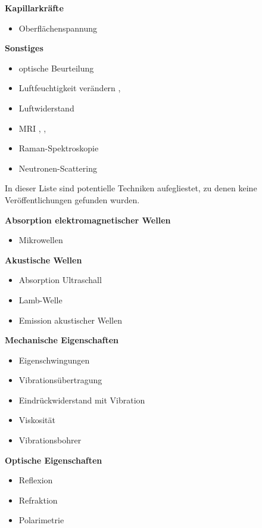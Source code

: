 \textbf{Kapillarkräfte}
\begin{itemize}

\item Oberflächenspannung \cite{AlamShibly.2017}
\end{itemize}

\textbf{Sonstiges}
\begin{itemize}
\item optische Beurteilung \cite{miro}
\item Luftfeuchtigkeit verändern \cite{joule-thomson-wiki}, \cite{sensirion-sht4xa-sensors}
\item Luftwiderstand
\item MRI \cite{Adachi.2020}, \cite{Nowogrodzki.2018}, \cite{Yamaguchi.2023}
\item Raman-Spektroskopie \cite{Reichardt.2022}
\item Neutronen-Scattering \cite{Lombardo.2023}
\end{itemize}

In dieser Liste sind potentielle Techniken aufegliestet, zu denen keine Veröffentlichungen gefunden wurden.

\textbf{Absorption elektromagnetischer Wellen}
\begin{itemize}
\item Mikrowellen
\end{itemize}



\textbf{Akustische Wellen}
\begin{itemize}
\item Absorption Ultraschall
\item Lamb-Welle \cite{lamb}
\item Emission akustischer Wellen
\end{itemize}


\textbf{Mechanische Eigenschaften}
\begin{itemize}
\item Eigenschwingungen
\item Vibrationsübertragung
\item Eindrückwiderstand mit Vibration
\item Viskosität
\item Vibrationsbohrer
\end{itemize}


\textbf{Optische Eigenschaften}
\begin{itemize}
\item Reflexion
\item Refraktion
\item Polarimetrie
\end{itemize}

